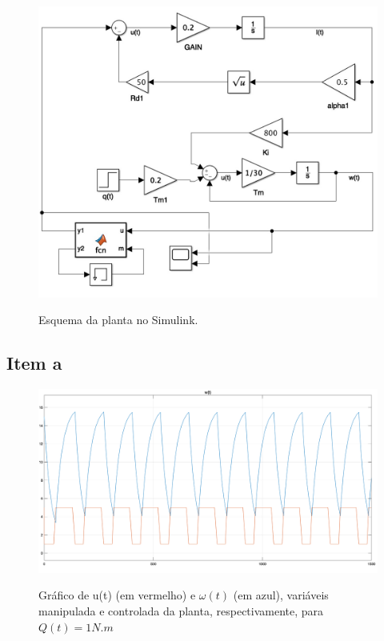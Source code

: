 \documentclass[11pt]{article}
\begin{document}
\begin{figure}[H]
	\centering
	{\includegraphics[width=\textwidth]
		{assets/q4_ab_control_schema.jpg}}
	\caption{Esquema da planta no Simulink.}
\end{figure}

\subsection{Item a}
\begin{figure}[H]
	\centering
	{\includegraphics[width=\textwidth]
		{assets/q4_a_plot.png}}
	\caption{Gráfico de u(t) (em vermelho) e $\omega(t)$ (em azul), variáveis manipulada e controlada da planta, respectivamente, para $Q(t) = 1 N.m$}
\end{figure}
\end{document}
